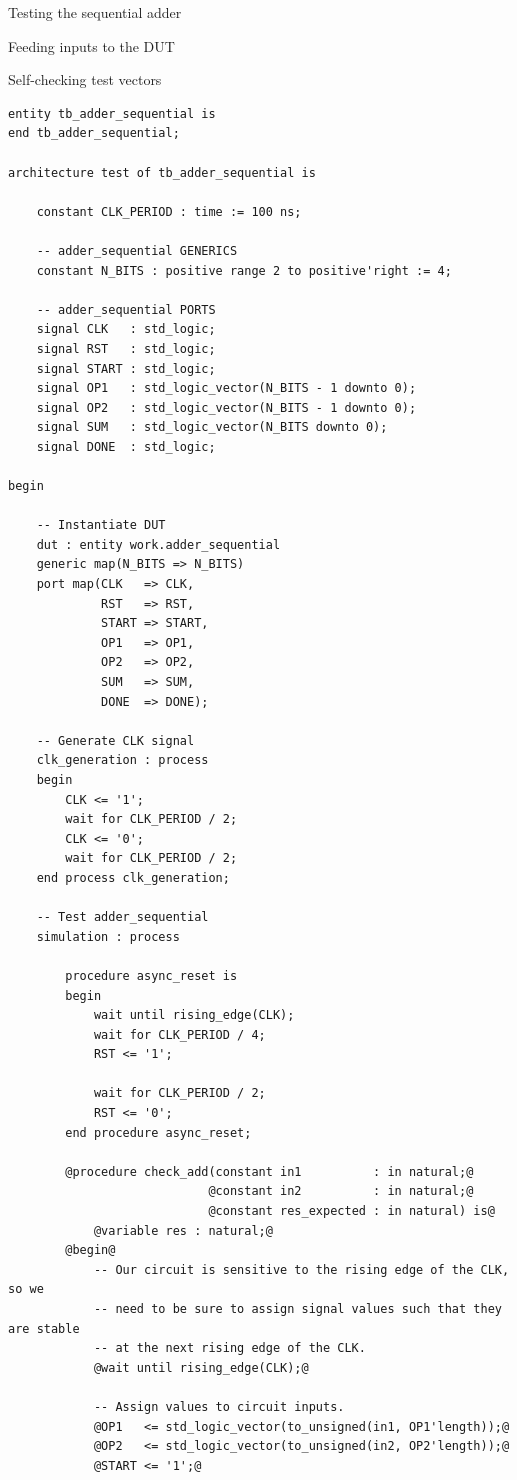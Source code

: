 \documentclass[lab]{course}
\begin{document}
\begin{section}{Testing the sequential adder}
\begin{subsection}{Feeding inputs to the DUT}
\begin{subsubsection}{Self-checking test vectors}
\begin{lstlisting}[caption={Add test vectors}, label={lst:sequential_process_simulation_test_vectors}]
entity tb_adder_sequential is
end tb_adder_sequential;

architecture test of tb_adder_sequential is

    constant CLK_PERIOD : time := 100 ns;

    -- adder_sequential GENERICS
    constant N_BITS : positive range 2 to positive'right := 4;

    -- adder_sequential PORTS
    signal CLK   : std_logic;
    signal RST   : std_logic;
    signal START : std_logic;
    signal OP1   : std_logic_vector(N_BITS - 1 downto 0);
    signal OP2   : std_logic_vector(N_BITS - 1 downto 0);
    signal SUM   : std_logic_vector(N_BITS downto 0);
    signal DONE  : std_logic;

begin

    -- Instantiate DUT
    dut : entity work.adder_sequential
    generic map(N_BITS => N_BITS)
    port map(CLK   => CLK,
             RST   => RST,
             START => START,
             OP1   => OP1,
             OP2   => OP2,
             SUM   => SUM,
             DONE  => DONE);

    -- Generate CLK signal
    clk_generation : process
    begin
        CLK <= '1';
        wait for CLK_PERIOD / 2;
        CLK <= '0';
        wait for CLK_PERIOD / 2;
    end process clk_generation;

    -- Test adder_sequential
    simulation : process

        procedure async_reset is
        begin
            wait until rising_edge(CLK);
            wait for CLK_PERIOD / 4;
            RST <= '1';

            wait for CLK_PERIOD / 2;
            RST <= '0';
        end procedure async_reset;

        @procedure check_add(constant in1          : in natural;@
                            @constant in2          : in natural;@
                            @constant res_expected : in natural) is@
            @variable res : natural;@
        @begin@
            -- Our circuit is sensitive to the rising edge of the CLK, so we
            -- need to be sure to assign signal values such that they are stable
            -- at the next rising edge of the CLK.
            @wait until rising_edge(CLK);@

            -- Assign values to circuit inputs.
            @OP1   <= std_logic_vector(to_unsigned(in1, OP1'length));@
            @OP2   <= std_logic_vector(to_unsigned(in2, OP2'length));@
            @START <= '1';@


\end{lstlisting}
\end{subsubsection}
\end{subsection}
\end{section}
\end{document}
